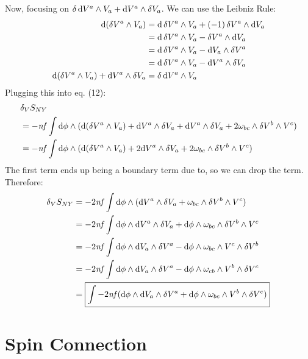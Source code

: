 \documentclass[12pt]{article}
\begin{document}
Now, focusing on $\var{\dd{V^a}} \wedge V_a + \dd V^a \wedge \var{V_a}$. We can use the Leibniz Rule:
\begin{align*}
  \dd(\var{V^a} \wedge V_a) &= \dd{\var{V^a}} \wedge V_a + (-1)\var{V^a} \wedge \dd{V_a} \\
  &= \dd{\var{V^a}} \wedge V_a - \var{V^a} \wedge \dd{V_a} \\
  &= \dd{\var{V^a}} \wedge V_a - \dd{V_a} \wedge \var{V^a} \\
  &= \dd{\var{V^a}} \wedge V_a - \dd{V^a} \wedge \var{V_a} \\
  \dd(\var{V^a} \wedge V_a) + \dd{V^a} \wedge \var{V_a} &= \var{\dd{V^a}} \wedge V_a
\end{align*}
Plugging this into eq. (12):
\begin{align*}
  &\var_V{S_{NY}} \\ &= -\mathit{nf}\int \dd\phi \wedge (\dd(\var{V^a} \wedge V_a) + \dd{V^a} \wedge \var{V_a} + \dd V^a \wedge \var{V_a} + 2\omega_{bc} \wedge \var{V^b} \wedge V^c) \\
  &= -\mathit{nf}\int \dd\phi \wedge (\dd(\var{V^a} \wedge V_a) + 2\dd V^a \wedge \var{V_a} + 2\omega_{bc} \wedge \var{V^b} \wedge V^c)
\end{align*}
The first term ends up being a boundary term due to, so we can drop the term. Therefore:
\begin{align*}
  \var_V{S_{NY}} &= -2\mathit{nf}\int \dd\phi \wedge (\dd V^a \wedge \var{V_a} + \omega_{bc} \wedge \var{V^b} \wedge V^c) \\
  &= -2\mathit{nf} \int \dd\phi \wedge \dd V^a \wedge \var{V_a} + \dd\phi \wedge \omega_{bc} \wedge \var{V^b} \wedge V^c \\
  &= -2\mathit{nf} \int \dd\phi \wedge \dd V_a \wedge \var{V^a} - \dd\phi \wedge \omega_{bc} \wedge V^c \wedge \var{V^b} \\
  &= -2\mathit{nf} \int \dd\phi \wedge \dd V_a \wedge \var{V^a} - \dd\phi \wedge \omega_{cb} \wedge V^b \wedge \var{V^c} \\
  &= \boxed{\int -2\mathit{nf} (\dd\phi \wedge \dd V_a \wedge \var{V^a} + \dd\phi \wedge \omega_{bc} \wedge V^b \wedge \var{V^c})} \\
\end{align*}

\section{Spin Connection}
\end{document}

